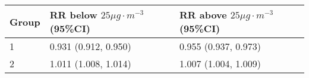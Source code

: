 \begin{tabular}{lll}
  \hline
Group & RR below $25 \mu g \cdot m^{-3}$ (95\%CI) & RR above $25 \mu g \cdot m^{-3}$ (95\%CI) \\ 
  \hline
   1 & 0.931 (0.912, 0.950) & 0.955 (0.937, 0.973) \\ 
     2 & 1.011 (1.008, 1.014) & 1.007 (1.004, 1.009) \\ 
   \hline
\end{tabular}

